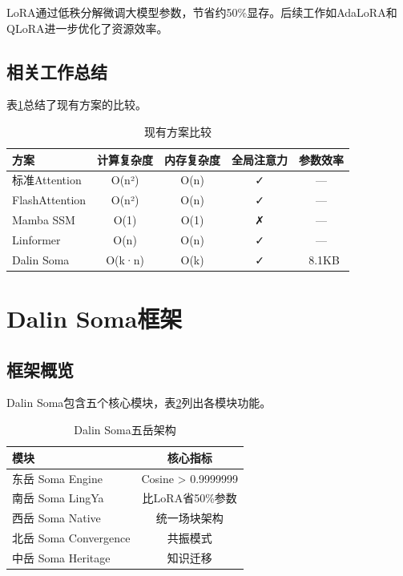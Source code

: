 \documentclass[12pt, a4paper]{article}
\begin{document}
LoRA\cite{hu2022lora}通过低秩分解微调大模型参数，节省约50\%显存。后续工作如AdaLoRA\cite{zhang2023adalora}和QLoRA\cite{dettmers2023qlora}进一步优化了资源效率。

\subsection{相关工作总结}

表\ref{tab:comparison}总结了现有方案的比较。

\begin{table}[H]
\centering
\caption{现有方案比较}
\label{tab:comparison}
\begin{tabular}{@{}lcccc@{}}
\toprule
\textbf{方案} & \textbf{计算复杂度} & \textbf{内存复杂度} & \textbf{全局注意力} & \textbf{参数效率} \\
\midrule
标准Attention & O(n²) & O(n) & ✓ & --- \\
FlashAttention & O(n²) & O(n) & ✓ & --- \\
Mamba SSM & O(1) & O(1) & ✗ & --- \\
Linformer & O(n) & O(n) & ✓ & --- \\
Dalin Soma & O(k·n) & O(k) & ✓ & ~8.1KB \\
\bottomrule
\end{tabular}
\end{table}

\newpage

\section{Dalin Soma框架}

\subsection{框架概览}

Dalin Soma包含五个核心模块，表\ref{tab:modules}列出各模块功能。

\begin{table}[H]
\centering
\caption{Dalin Soma五岳架构}
\label{tab:modules}
\begin{tabular}{@{}lc@{}}
\toprule
\textbf{模块} & \textbf{核心指标} \\
\midrule
东岳 Soma Engine & Cosine > 0.9999999 \\
南岳 Soma LingYa & 比LoRA省50\%参数 \\
西岳 Soma Native & 统一场块架构 \\
北岳 Soma Convergence & 共振模式 \\
中岳 Soma Heritage & 知识迁移 \\
\bottomrule
\end{tabular}
\end{table}
\end{document}
